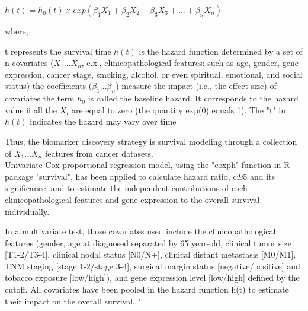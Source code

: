 \documentclass[preprint,12pt]{elsarticle}
\newenvironment{MyIndent}
{\par\leftskip1cm\relax\rightskip1cm\relax}
{\par\leftskip0cm\relax\rightskip0cm\relax}
\newenvironment{MyColorPar}[1]{%
    \leavevmode\color{#1}\ignorespaces%
}{%
}%
\begin{document}
\begin{MyColorPar}{blue}
\begin{MyIndent}
\begin{MyColorPar}{red}
\begin{flushleft}
$h(t) = h_0(t) \times exp(\beta_1 X_1 + \beta_2 X_2 + \beta_3 X_3 + ... + \beta_n X_n)$\\[0.3cm]
\end{flushleft}
where,\\
\begin{outline} %
\1 t represents the survival time
\1 $h(t)$ is the hazard function determined by a set of n covariates ($X_1...X_n$, e.x., clinicopathological features: such as age, gender, gene expression, cancer stage, smoking, alcohol, or even spiritual, emotional, and social status)
\1 the coefficients ($\beta_1...\beta_n$) measure the impact (i.e., the effect size) of covariates
\1 the term $h_0$ is called the baseline hazard. It corresponds to the hazard value if all the $X_i$ are equal to zero (the quantity exp(0) equals 1). The "t" in $h(t)$ indicates the hazard may vary over time
\end{outline}

Thus, the biomarker discovery strategy is survival modeling through a collection of $X_1...X_n$ features from cancer datasets.\\[1cm]

Univariate Cox proportional regression model, using the "coxph" function in R package "survival", has been applied to calculate hazard ratio, \acrfull{ci95} and its significance, and to estimate the independent contributions of each clinicopathological features and gene expression to the overall survival individually.


In a multivariate test, those covariates used include the clinicopathological features (gender, age at diagnosed separated by 65 year-old, clinical tumor size [T1-2/T3-4], clinical nodal status [N0/N+], clinical distant metastasis [M0/M1], TNM staging [stage 1-2/stage 3-4], surgical margin status [negative/positive] and tobacco exposure [low/high]), and gene expression level [low/high] defined by the cutoff.
All covariates have been pooled in the hazard function h(t) to estimate their impact on the overall survival.
"
\end{MyColorPar} %
\end{MyIndent}

\end{MyColorPar}%
\end{document}
